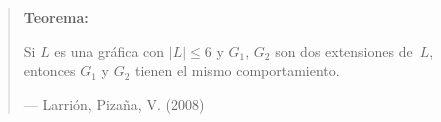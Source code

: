 \documentclass[beamer]{standalone}
\begin{document}
\begin{standaloneframe}
  \begin{quote}
    \textbf{Teorema:}

    Si $L$ es una gráfica con $|L|\leq 6$ y $G_{1}$, $G_{2}$ son dos
    extensiones de~$L$, entonces $G_{1}$ y $G_{2}$ tienen el
    mismo comportamiento.

    \hfill--- \color{purple} Larrión, Pizaña, V. (2008)
  \end{quote}
\end{standaloneframe}
\end{document}
